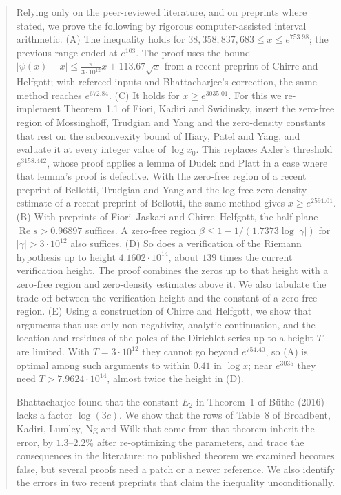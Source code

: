 \documentclass{amsart}
\theoremstyle{definition}
\theoremstyle{remark}
\theoremstyle{plain}
\numberwithin{equation}{section}
\newcommand{\NN}{38{,}358{,}837{,}683}
\newcommand{\TDhyp}{4.1602\cdot10^{14}}
\begin{document}
\begin{abstract}
Relying only on the peer-reviewed literature, and on preprints where stated, we prove the following by rigorous computer-assisted interval arithmetic.
(A) The inequality holds for $\NN\le x\le e^{753.98}$; the previous range ended at $e^{103}$. The proof uses the bound $|\psi(x)-x|\le\frac{\pi}{3\cdot10^{12}}x+113.67\sqrt x$ from a recent preprint of Chirre and Helfgott; with refereed inputs and Bhattacharjee's correction, the same method reaches $e^{672.84}$.
(C) It holds for $x\ge e^{3035.01}$. For this we re-implement Theorem~1.1 of Fiori, Kadiri and Swidinsky, insert the zero-free region of Mossinghoff, Trudgian and Yang and the zero-density constants that rest on the subconvexity bound of Hiary, Patel and Yang, and evaluate it at every integer value of $\log x_0$. This replaces Axler's threshold $e^{3158.442}$, whose proof applies a lemma of Dudek and Platt in a case where that lemma's proof is defective. With the zero-free region of a recent preprint of Bellotti, Trudgian and Yang and the log-free zero-density estimate of a recent preprint of Bellotti, the same method gives $x\ge e^{2591.01}$.
(B) With preprints of Fiori--Jaskari and Chirre--Helfgott, the half-plane $\operatorname{Re}s>0.96897$ suffices. A zero-free region $\beta\le1-1/(1.7373\log|\gamma|)$ for $|\gamma|>3\cdot10^{12}$ also suffices.
(D) So does a verification of the Riemann hypothesis up to height $\TDhyp$, about $139$ times the current verification height. The proof combines the zeros up to that height with a zero-free region and zero-density estimates above it. We also tabulate the trade-off between the verification height and the constant of a zero-free region.
(E) Using a construction of Chirre and Helfgott, we show that arguments that use only non-negativity, analytic continuation, and the location and residues of the poles of the Dirichlet series up to a height $T$ are limited. With $T=3\cdot10^{12}$ they cannot go beyond $e^{754.40}$, so (A) is optimal among such arguments to within $0.41$ in $\log x$; near $e^{3035}$ they need $T>7.9624\cdot10^{14}$, almost twice the height in (D).

Bhattacharjee found that the constant $E_2$ in Theorem~1 of B\"uthe (2016) lacks a factor $\log(3c)$. We show that the rows of Table~8 of Broadbent, Kadiri, Lumley, Ng and Wilk that come from that theorem inherit the error, by $1.3$--$2.2\%$ after re-optimizing the parameters, and trace the consequences in the literature: no published theorem we examined becomes false, but several proofs need a patch or a newer reference. We also identify the errors in two recent preprints that claim the inequality unconditionally.
\end{abstract}
\end{document}
